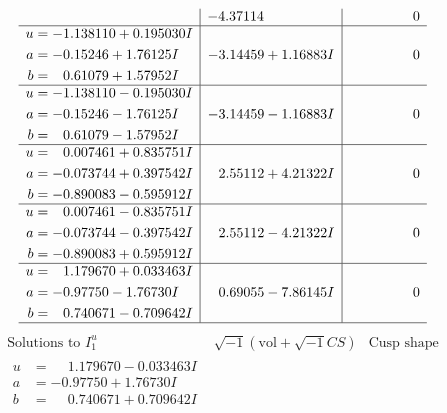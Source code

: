\documentclass[1p]{elsarticle_modified}
\theoremstyle{definition}
\newcommand{\I}{\sqrt{-1}}
\begin{document}
$$\begin{array}{c|c|c}
 & -4.37114\phantom{ +0.000000I} & \phantom{-0.000000 } 0 \\ \hline\begin{aligned}
u &= -1.138110 + 0.195030 I \\
a &= -0.15246 + 1.76125 I \\
b &= \phantom{-}0.61079 + 1.57952 I\end{aligned}
 & -3.14459 + 1.16883 I & \phantom{-0.000000 } 0 \\ \hline\begin{aligned}
u &= -1.138110 - 0.195030 I \\
a &= -0.15246 - 1.76125 I \\
b &= \phantom{-}0.61079 - 1.57952 I\end{aligned}
 & -3.14459 - 1.16883 I & \phantom{-0.000000 } 0 \\ \hline\begin{aligned}
u &= \phantom{-}0.007461 + 0.835751 I \\
a &= -0.073744 + 0.397542 I \\
b &= -0.890083 - 0.595912 I\end{aligned}
 & \phantom{-}2.55112 + 4.21322 I & \phantom{-0.000000 } 0 \\ \hline\begin{aligned}
u &= \phantom{-}0.007461 - 0.835751 I \\
a &= -0.073744 - 0.397542 I \\
b &= -0.890083 + 0.595912 I\end{aligned}
 & \phantom{-}2.55112 - 4.21322 I & \phantom{-0.000000 } 0 \\ \hline\begin{aligned}
u &= \phantom{-}1.179670 + 0.033463 I \\
a &= -0.97750 - 1.76730 I \\
b &= \phantom{-}0.740671 - 0.709642 I\end{aligned}
 & \phantom{-}0.69055 - 7.86145 I & \phantom{-0.000000 } 0\\
 \hline 
 \end{array}$$\newpage$$\begin{array}{c|c|c}  
\text{Solutions to }I^u_{1}& \I (\text{vol} + \sqrt{-1}CS) & \text{Cusp shape}\\
 \hline 
\begin{aligned}
u &= \phantom{-}1.179670 - 0.033463 I \\
a &= -0.97750 + 1.76730 I \\
b &= \phantom{-}0.740671 + 0.709642 I\end{aligned}

\end{array}$$
\end{document}
